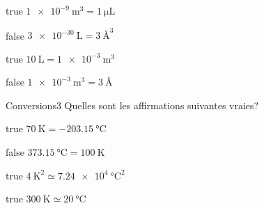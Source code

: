         \begin{reponses}
            \item[true] $\SI{1e-9}{\meter\cubed} = \SI{1}{\micro\liter}$
            \item[false] $\SI{3e-30}{\liter} = \SI{3}{\angstrom\cubed}$
            \item[true] $\SI{10}{\liter} = \SI{1e-3}{\meter\cubed}$
            \item[false] $\SI{1e-3}{\meter\cubed} = \SI{3}{\angstrom}$
        \end{reponses}
        \begin{question}{}{Conversions}{3}{}
            Quelles sont les affirmations suivantes vraies?
        \end{question}
        \begin{reponses}
            \item[true] $\SI{70}{\kelvin} = \SI{-203.15}{\celsius}$
            \item[false] $\SI{373.15}{\celsius} = \SI{100}{\kelvin}$
            \item[true] $\SI{4}{\kelvin\squared} \simeq \SI{7.24e4}{\celsius\squared}$
            \item[true] $\SI{300}{\kelvin} \simeq \SI{20}{\celsius}$
        \end{reponses}
